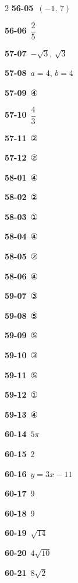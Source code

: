 \documentclass[10pt,a4paper]{article}
\begin{document}
\begin{multicols}{2}
\noindent\textbf{56-05}\ $(-1,\,7)$\par
\noindent\textbf{56-06}\ $\dfrac{2}{5}$\par
\noindent\textbf{57-07}\ $-\sqrt{3}$, $\sqrt{3}$\par
\noindent\textbf{57-08}\ $a=4$, $b=4$\par
\noindent\textbf{57-09}\ ④\par
\noindent\textbf{57-10}\ $\dfrac{4}{3}$\par
\noindent\textbf{57-11}\ ②\par
\noindent\textbf{57-12}\ ②\par
\noindent\textbf{58-01}\ ④\par
\noindent\textbf{58-02}\ ②\par
\noindent\textbf{58-03}\ ①\par
\noindent\textbf{58-04}\ ④\par
\noindent\textbf{58-05}\ ②\par
\noindent\textbf{58-06}\ ④\par
\noindent\textbf{59-07}\ ③\par
\noindent\textbf{59-08}\ ⑤\par
\noindent\textbf{59-09}\ ⑤\par
\noindent\textbf{59-10}\ ③\par
\noindent\textbf{59-11}\ ⑤\par
\noindent\textbf{59-12}\ ①\par
\noindent\textbf{59-13}\ ④\par
\noindent\textbf{60-14}\ $5\pi$\par
\noindent\textbf{60-15}\ 2\par
\noindent\textbf{60-16}\ $y=3x-11$\par
\noindent\textbf{60-17}\ 9\par
\noindent\textbf{60-18}\ 9\par
\noindent\textbf{60-19}\ $\sqrt{14}$\par
\noindent\textbf{60-20}\ $4\sqrt{10}$\par
\noindent\textbf{60-21}\ $8\sqrt{2}$\par
\end{multicols}
\end{document}
